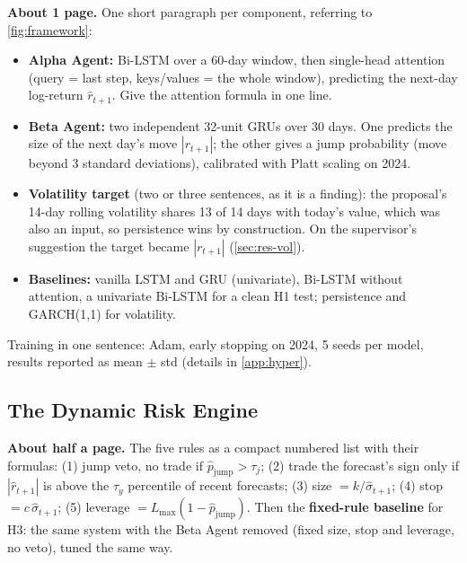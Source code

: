 \begin{guide}
\textbf{About 1 page.} One short paragraph per component, referring to \cref{fig:framework}:
\begin{itemize}
  \item \textbf{Alpha Agent:} Bi-LSTM over a 60-day window, then single-head attention (query = last step, keys/values = the whole window), predicting the next-day log-return $\hat r_{t+1}$. Give the attention formula in one line.
  \item \textbf{Beta Agent:} two independent 32-unit GRUs over 30 days. One predicts the size of the next day's move $|r_{t+1}|$; the other gives a jump probability (move beyond 3 standard deviations), calibrated with Platt scaling on 2024.
  \item \textbf{Volatility target} (two or three sentences, as it is a finding): the proposal's 14-day rolling volatility shares 13 of 14 days with today's value, which was also an input, so persistence wins by construction. On the supervisor's suggestion the target became $|r_{t+1}|$ (\cref{sec:res-vol}).
  \item \textbf{Baselines:} vanilla LSTM and GRU (univariate), Bi-LSTM without attention, a univariate Bi-LSTM for a clean H1 test; persistence and GARCH(1,1) for volatility.
\end{itemize}
Training in one sentence: Adam, early stopping on 2024, 5 seeds per model, results reported as mean $\pm$ std (details in \cref{app:hyper}).
\end{guide}
\tbc{}

\subsection{The Dynamic Risk Engine}\label{sec:risk-engine}
\begin{guide}
\textbf{About half a page.} The five rules as a compact numbered list with their formulas:
(1) jump veto, no trade if $\hat p_{\text{jump}} > \tau_j$;
(2) trade the forecast's sign only if $|\hat r_{t+1}|$ is above the $\tau_y$ percentile of recent forecasts;
(3) size $= k/\hat\sigma_{t+1}$;
(4) stop $= c\,\hat\sigma_{t+1}$;
(5) leverage $= L_{\max}(1-\hat p_{\text{jump}})$.
Then the \textbf{fixed-rule baseline} for H3: the same system with the Beta Agent removed (fixed size, stop and leverage, no veto), tuned the same way.
\end{guide}
\tbc{}

